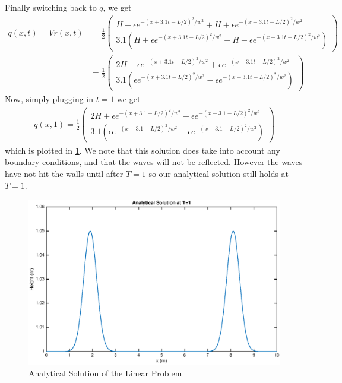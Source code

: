 Finally switching back to $q$, we get 
\begin{align*}
q(x,t) = Vr(x,t) &= \frac{1}{2} \begin{pmatrix}
H + \epsilon e^{-(x+3.1t-L/2)^2/w^2} +H + \epsilon e^{-(x-3.1t-L/2)^2/w^2} \\
3.1(H + \epsilon e^{-(x+3.1t-L/2)^2/w^2} -H - \epsilon e^{-(x-3.1t-L/2)^2/w^2})
\end{pmatrix} \\
&= \frac{1}{2}\begin{pmatrix}
 2H + \epsilon e^{-(x+3.1t-L/2)^2/w^2} + \epsilon e^{-(x-3.1t-L/2)^2/w^2} \\
3.1( \epsilon e^{-(x+3.1t-L/2)^2/w^2} - \epsilon e^{-(x-3.1t-L/2)^2/w^2})
\end{pmatrix}
\end{align*} 
Now, simply plugging in $t=1$ we get
\begin{align*}
q(x,1) = \frac{1}{2}\begin{pmatrix}
 2H + \epsilon e^{-(x+3.1-L/2)^2/w^2} + \epsilon e^{-(x-3.1-L/2)^2/w^2} \\
3.1( \epsilon e^{-(x+3.1-L/2)^2/w^2} - \epsilon e^{-(x-3.1-L/2)^2/w^2})
\end{pmatrix}
\end{align*}
which is plotted in \ref{anal}.
We note that this solution does take into account any boundary conditions, and that the waves will not be reflected. However the waves have not hit the walls until after $T=1$ so our analytical solution still holds at $T=1$. 

\begin{figure}
\begin{center}
\includegraphics[scale=0.5]{analytical.eps}
\caption{Analytical Solution of the Linear Problem}
\label{anal}
\end{center}
\end{figure}


